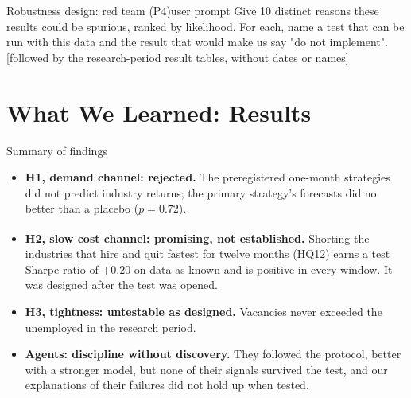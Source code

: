 \documentclass[11pt,letterpaper]{article}
\newenvironment{answerbox}{\begin{panel}{Summary of findings}}{\end{panel}}
\newcommand{\ph}{\textsuperscript{\dag}}
\begin{document}
\begin{promptbox}{Robustness design: red team (P4)}{user prompt}
Give 10 distinct reasons these results could be spurious, ranked by likelihood.
For each, name a test that can be run with this data and the result that would
make us say "do not implement". [followed by the research-period result tables,
without dates or names]
\end{promptbox}




\newpage



\section{What We Learned: Results}\label{sec:learn}

\begin{answerbox}
\begin{itemize}[leftmargin=1.1em]
\item \textbf{H1, demand channel: rejected.} The preregistered one-month
  strategies did not predict industry returns; the primary strategy's forecasts
  did no better than a placebo ($p=0.72$).
\item \textbf{H2, slow cost channel: promising, not established\ph.} Shorting
  the industries that hire and quit fastest for twelve months (HQ12) earns a
  test Sharpe ratio of $+0.20$ on data as known and is positive in every
  window. It was designed after the test was opened.
\item \textbf{H3, tightness: untestable as designed.} Vacancies never exceeded
  the unemployed in the research period.
\item \textbf{Agents: discipline without discovery.} They followed the
  protocol, better with a stronger model, but none of their signals survived the
  test, and our explanations of their failures did not hold up when tested.
\end{itemize}
\end{answerbox}
\end{document}
